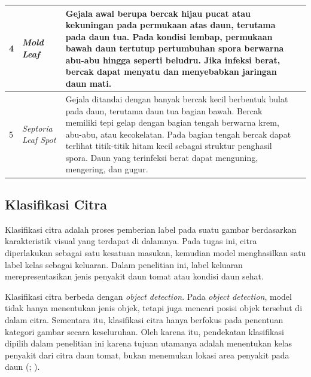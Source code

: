 \begin{sectioncontent}
\begin{subsectioncontent}
{\begin{longtable}{|p{0.7cm}|p{3.6cm}|p{7cm}|p{2.8cm}|}
            4 & \textit{Mold Leaf}
            & Gejala awal berupa bercak hijau pucat atau kekuningan pada permukaan atas daun, terutama pada daun tua. Pada kondisi lembap, permukaan bawah daun tertutup pertumbuhan spora berwarna abu-abu hingga seperti beludru. Jika infeksi berat, bercak dapat menyatu dan menyebabkan jaringan daun mati.
            & \citep{clemson2025tomatoDiseases} \\
            \hline

            5 & \textit{Septoria Leaf Spot}
            & Gejala ditandai dengan banyak bercak kecil berbentuk bulat pada daun, terutama daun tua bagian bawah. Bercak memiliki tepi gelap dengan bagian tengah berwarna krem, abu-abu, atau kecokelatan. Pada bagian tengah bercak dapat terlihat titik-titik hitam kecil sebagai struktur penghasil spora. Daun yang terinfeksi berat dapat menguning, mengering, dan gugur.
            & \citep{clemson2025tomatoDiseases,pandey2024septoria} \\
            \hline
        \end{longtable}
        }
    \end{subsectioncontent}

    \subsection{Klasifikasi Citra}
    \begin{subsectioncontent}
        \hspace{\parindent}Klasifikasi citra adalah proses pemberian label pada suatu gambar berdasarkan karakteristik visual yang terdapat di dalamnya. Pada tugas ini, citra diperlakukan sebagai satu kesatuan masukan, kemudian model menghasilkan satu label kelas sebagai keluaran. Dalam penelitian ini, label keluaran merepresentasikan jenis penyakit daun tomat atau kondisi daun sehat.

        Klasifikasi citra berbeda dengan \textit{object detection}. Pada \textit{object detection}, model tidak hanya menentukan jenis objek, tetapi juga mencari posisi objek tersebut di dalam citra. Sementara itu, klasifikasi citra hanya berfokus pada penentuan kategori gambar secara keseluruhan. Oleh karena itu, pendekatan klasifikasi dipilih dalam penelitian ini karena tujuan utamanya adalah menentukan kelas penyakit dari citra daun tomat, bukan menemukan lokasi area penyakit pada daun (\citealp[bagian \textit{Image Classification}]{ultralyticsclassify}; \citealp[hlm. 1--2 dan 7--9]{sun2024tomatoclassification}).
    \end{subsectioncontent}


\end{sectioncontent}
